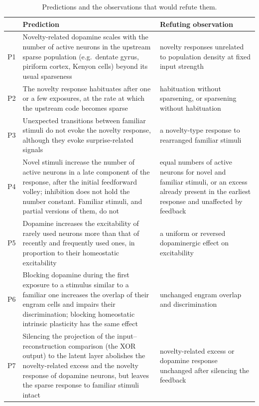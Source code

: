 \documentclass[11pt,a4paper]{article}
\begin{document}
\begin{table}[t]\small\centering
\caption{Predictions and the observations that would refute them.}\label{tab:predictions}
\begin{tabularx}{\textwidth}{@{}P{0.6cm}LL@{}}
\toprule
& Prediction & Refuting observation \\
\midrule
P1 & Novelty-related dopamine scales with the number of active neurons in the upstream sparse population (e.g.\ dentate gyrus, piriform cortex, Kenyon cells) beyond its usual sparseness & novelty responses unrelated to population density at fixed input strength \\
P2 & The novelty response habituates after one or a few exposures, at the rate at which the upstream code becomes sparse & habituation without sparsening, or sparsening without habituation \\
P3 & Unexpected transitions between familiar stimuli do not evoke the novelty response, although they evoke surprise-related signals & a novelty-type response to rearranged familiar stimuli \\
P4 & Novel stimuli increase the number of active neurons in a late component of the response, after the initial feedforward volley; inhibition does not hold the number constant. Familiar stimuli, and partial versions of them, do not & equal numbers of active neurons for novel and familiar stimuli, or an excess already present in the earliest response and unaffected by feedback \\
P5 & Dopamine increases the excitability of rarely used neurons more than that of recently and frequently used ones, in proportion to their homeostatic excitability & a uniform or reversed dopaminergic effect on excitability \\
P6 & Blocking dopamine during the first exposure to a stimulus similar to a familiar one increases the overlap of their engram cells and impairs their discrimination; blocking homeostatic intrinsic plasticity has the same effect & unchanged engram overlap and discrimination \\
P7 & Silencing the projection of the input--reconstruction comparison (the XOR output) to the latent layer abolishes the novelty-related excess and the novelty response of dopamine neurons, but leaves the sparse response to familiar stimuli intact & novelty-related excess or dopamine response unchanged after silencing the feedback \\
\bottomrule
\end{tabularx}
\end{table}
\end{document}
